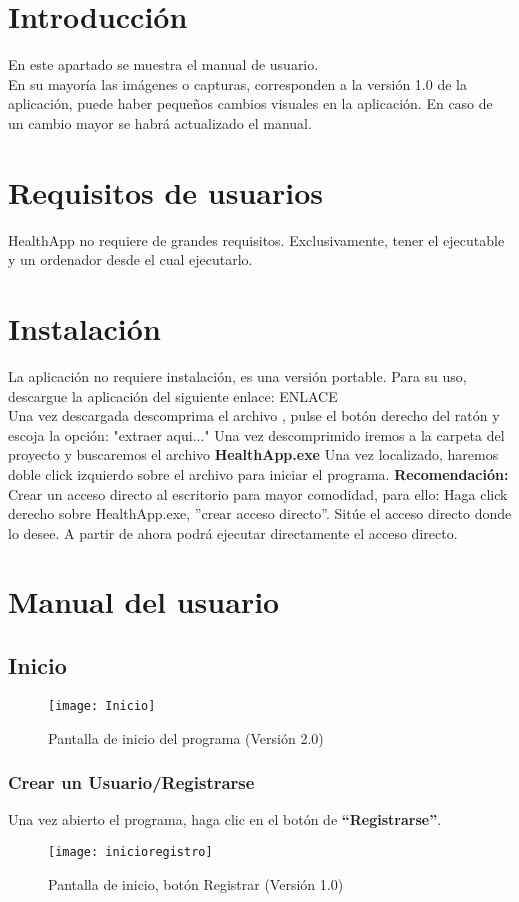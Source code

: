 
\section{Introducción}
En este apartado se muestra el manual de usuario.\\
En su mayoría las imágenes o capturas, corresponden a la versión 1.0 de la aplicación, puede haber pequeños cambios visuales en la aplicación. En caso de un cambio mayor se habrá actualizado el manual.
\section{Requisitos de usuarios}
HealthApp no requiere de grandes requisitos. Exclusivamente, tener el ejecutable y un ordenador desde el cual ejecutarlo.
\section{Instalación}
La aplicación no requiere instalación, es una versión portable. Para su uso, descargue la aplicación del siguiente enlace: ENLACE\\
Una vez descargada descomprima el archivo , pulse el botón derecho del ratón y escoja la opción: "extraer aqui..."
Una vez descomprimido iremos a la carpeta del proyecto y buscaremos el archivo \textbf{HealthApp.exe}
Una vez localizado, haremos doble click izquierdo sobre el archivo para iniciar el programa. \textbf{Recomendación:} Crear un acceso directo al escritorio para mayor comodidad, para ello: Haga click derecho sobre HealthApp.exe, ''crear acceso directo''. Sitúe el acceso directo donde lo desee. A partir de ahora podrá ejecutar directamente el acceso directo.

\section{Manual del usuario}
\subsection{Inicio}
\begin{figure}[htb]
\centering
\texttt{[image: Inicio]} 
\caption{Pantalla de inicio del programa (Versión 2.0)}
\end{figure}
\subsubsection{Crear un Usuario/Registrarse}
Una vez abierto el programa, haga clic en el botón de \textbf{“Registrarse”}. 
\begin{figure}[htb]
\centering
\texttt{[image: inicioregistro]} 
\caption{Pantalla de inicio, botón Registrar (Versión 1.0)}
\end{figure}

